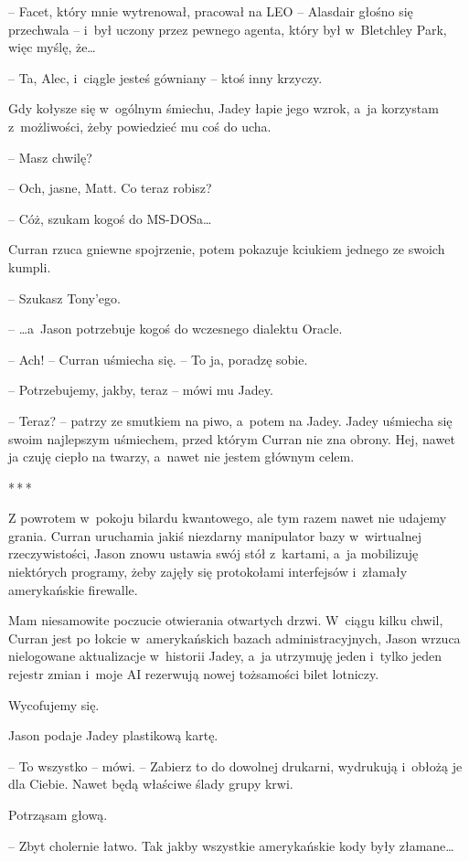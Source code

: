 \documentclass[oneside,polish,12pt,sfheadings]{mwbk}
\newcommand{\threeast}{\bigskip\par\centerline{*\,*\,*}\medskip\par}%
\begin{document}
-- Facet, który mnie wytrenował, pracował na LEO -- Alasdair głośno się
przechwala -- i~był uczony przez pewnego agenta, który był w~Bletchley
Park, więc myślę, że\ldots

-- Ta, Alec, i~ciągle jesteś gówniany -- ktoś inny krzyczy.

Gdy kołysze się w~ogólnym śmiechu, Jadey łapie jego wzrok, a~ja
korzystam z~możliwości, żeby powiedzieć mu coś do ucha. 

-- Masz chwilę?

-- Och, jasne, Matt. Co teraz robisz?

-- Cóż, szukam kogoś do MS-DOSa\ldots

Curran rzuca gniewne spojrzenie, potem pokazuje kciukiem jednego ze
swoich kumpli. 

-- Szukasz Tony'ego.

-- \ldots a~Jason potrzebuje kogoś do wczesnego dialektu Oracle.

-- Ach! -- Curran uśmiecha się. -- To ja, poradzę sobie.

-- Potrzebujemy, jakby, teraz -- mówi mu Jadey.

-- Teraz? -- patrzy ze smutkiem na piwo, a~potem na Jadey. Jadey uśmiecha
się swoim najlepszym uśmiechem, przed którym Curran nie zna obrony. Hej,
nawet ja czuję ciepło na twarzy, a~nawet nie jestem głównym celem.

\threeast

Z powrotem w~pokoju bilardu kwantowego, ale tym razem nawet nie udajemy
grania. Curran uruchamia jakiś niezdarny manipulator bazy w~wirtualnej
rzeczywistości, Jason znowu ustawia swój stół z~kartami, a~ja mobilizuję
niektórych programy, żeby zajęły się protokołami interfejsów i~złamały
amerykańskie firewalle.

Mam niesamowite poczucie otwierania otwartych drzwi. W~ciągu kilku
chwil, Curran jest po łokcie w~amerykańskich bazach administracyjnych,
Jason wrzuca nielogowane aktualizacje w~historii Jadey, a~ja utrzymuję
jeden i~tylko jeden rejestr zmian i~moje AI rezerwują nowej tożsamości
bilet lotniczy.

Wycofujemy się.

Jason podaje Jadey plastikową kartę.

-- To wszystko -- mówi. -- Zabierz to do dowolnej drukarni, wydrukują i~obłożą je dla Ciebie. Nawet będą właściwe ślady grupy krwi.

Potrząsam głową. 

-- Zbyt cholernie łatwo. Tak jakby wszystkie
amerykańskie kody były złamane\ldots
\end{document}
